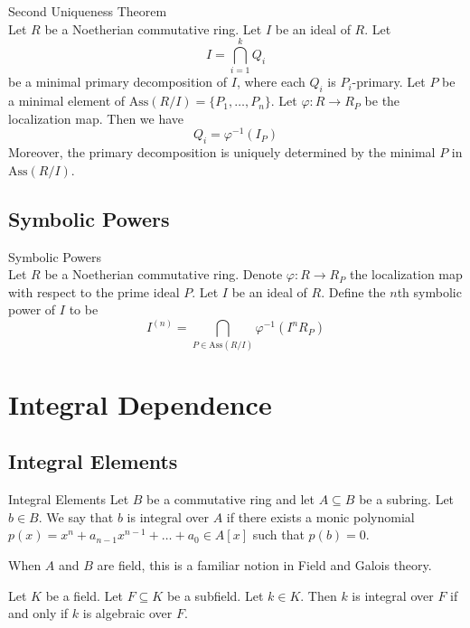 \documentclass[a4paper]{article}
\begin{document}
\begin{thm}{Second Uniqueness Theorem}{}\\
Let $R$ be a Noetherian commutative ring. Let $I$ be an ideal of $R$. Let $$I=\bigcap_{i=1}^kQ_i$$ be a minimal primary decomposition of $I$, where each $Q_i$ is $P_i$-primary. Let $P$ be a minimal element of $\text{Ass}(R/I)=\{P_1,\dots,P_n\}$. Let $\varphi:R\to R_P$ be the localization map. Then we have $$Q_i=\varphi^{-1}(I_P)$$ Moreover, the primary decomposition is uniquely determined by the minimal $P$ in $\text{Ass}(R/I)$. 
\end{thm}

\subsection{Symbolic Powers}
\begin{defn}{Symbolic Powers}{}\\
Let $R$ be a Noetherian commutative ring. Denote $\varphi:R\to R_P$ the localization map with respect to the prime ideal $P$. Let $I$ be an ideal of $R$. Define the $n$th symbolic power of $I$ to be $$I^{(n)}=\bigcap_{P\in\text{Ass}(R/I)}\varphi^{-1}(I^nR_P)$$
\end{defn}

\pagebreak
\section{Integral Dependence}
\subsection{Integral Elements}
\begin{defn}{Integral Elements}{} Let $B$ be a commutative ring and let $A\subseteq B$ be a subring. Let $b\in B$. We say that $b$ is integral over $A$ if there exists a monic polynomial $p(x)=x^n+a_{n-1}x^{n-1}+\dots+a_0\in A[x]$ such that $p(b)=0$. 
\end{defn}

When $A$ and $B$ are field, this is a familiar notion in Field and Galois theory. 

\begin{lmm}{}{} Let $K$ be a field. Let $F\subseteq K$ be a subfield. Let $k\in K$. Then $k$ is integral over $F$ if and only if $k$ is algebraic over $F$. 
\end{lmm}
\end{document}
